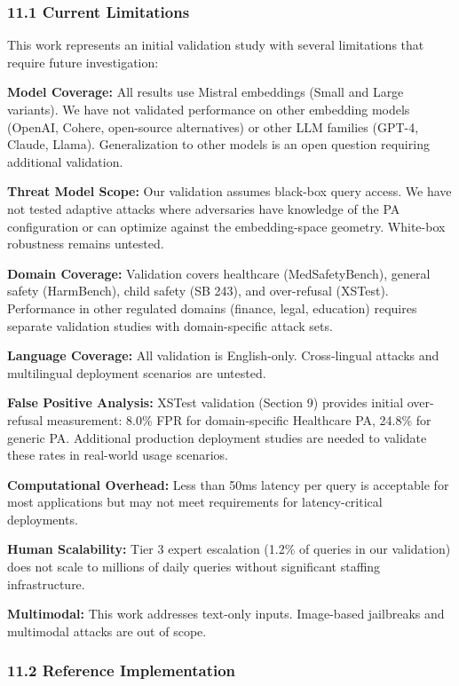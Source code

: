 \subsubsection{11.1 Current Limitations}\label{current-limitations}

This work represents an initial validation study with several
limitations that require future investigation:

\textbf{Model Coverage:} All results use Mistral embeddings (Small and
Large variants). We have not validated performance on other embedding
models (OpenAI, Cohere, open-source alternatives) or other LLM families
(GPT-4, Claude, Llama). Generalization to other models is an open
question requiring additional validation.

\textbf{Threat Model Scope:} Our validation assumes black-box query
access. We have not tested adaptive attacks where adversaries have
knowledge of the PA configuration or can optimize against the
embedding-space geometry. White-box robustness remains untested.

\textbf{Domain Coverage:} Validation covers healthcare (MedSafetyBench),
general safety (HarmBench), child safety (SB 243), and over-refusal
(XSTest). Performance in other regulated domains (finance, legal,
education) requires separate validation studies with domain-specific
attack sets.

\textbf{Language Coverage:} All validation is English-only.
Cross-lingual attacks and multilingual deployment scenarios are
untested.

\textbf{False Positive Analysis:} XSTest validation (Section 9) provides
initial over-refusal measurement: 8.0\% FPR for domain-specific
Healthcare PA, 24.8\% for generic PA. Additional production deployment
studies are needed to validate these rates in real-world usage
scenarios.

\textbf{Computational Overhead:} Less than 50ms latency per query is
acceptable for most applications but may not meet requirements for
latency-critical deployments.

\textbf{Human Scalability:} Tier 3 expert escalation (1.2\% of queries
in our validation) does not scale to millions of daily queries without
significant staffing infrastructure.

\textbf{Multimodal:} This work addresses text-only inputs. Image-based
jailbreaks and multimodal attacks are out of scope.

\subsubsection{11.2 Reference
Implementation}\label{reference-implementation}

